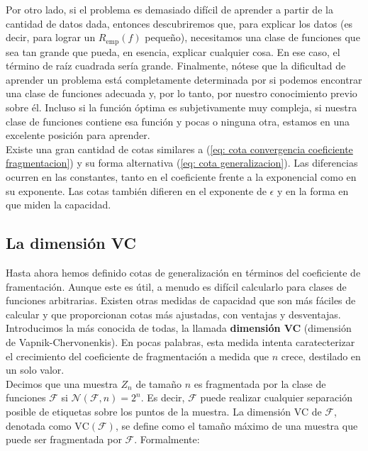 \documentclass{article}
\begin{document}
Por otro lado, si el problema es demasiado difícil de aprender a partir de la cantidad de datos dada, entonces 
descubriremos que, para explicar los datos (es decir, para lograr un \(R_{\text{emp}}(f)\) pequeño), necesitamos 
una clase de funciones que sea tan grande que pueda, en esencia, explicar cualquier cosa. En ese caso, el término 
de raíz cuadrada sería grande. Finalmente, nótese que la dificultad de aprender un problema está completamente 
determinada por si podemos encontrar una clase de funciones adecuada y, por lo tanto, por nuestro conocimiento 
previo sobre él. Incluso si la función óptima es subjetivamente muy compleja, si nuestra clase de funciones 
contiene esa función y pocas o ninguna otra, estamos en una excelente posición para aprender.\\

Existe una gran cantidad de cotas similares a (\ref{eq: cota convergencia coeficiente fragmentacion}) 
y su forma alternativa (\ref{eq: cota generalizacion}). Las diferencias ocurren en 
las constantes, tanto en el coeficiente frente a la exponencial como en su exponente. Las cotas también 
difieren en el exponente de \(\epsilon\) y en la forma en que miden la capacidad. \\

\subsection{La dimensión VC}

Hasta ahora hemos definido cotas de generalización en términos del coeficiente de framentación.
Aunque este es útil, a menudo es difícil calcularlo para clases de funciones arbitrarias. Existen otras medidas de capacidad
que son más fáciles de calcular y que proporcionan cotas más ajustadas, con ventajas y desventajas.
Introducimos la más conocida de todas, la llamada \textbf{dimensión VC} (dimensión de Vapnik-Chervonenkis). En pocas palabras,
esta medida intenta caratecterizar el crecimiento del coeficiente de fragmentación a medida que $n$ crece, destilado en un 
solo valor.\\

Decimos que una muestra \(Z_n\) de tamaño \(n\) es fragmentada por la clase de funciones 
\(\mathcal{F}\) si \(\mathcal{N}(\mathcal{F}, n) = 2^n\). Es decir, \(\mathcal{F}\) puede realizar cualquier separación posible de etiquetas sobre 
los puntos de la muestra. La dimensión VC de \(\mathcal{F}\), denotada como \(\text{VC}(\mathcal{F})\), se define como el tamaño 
máximo de una muestra que puede ser fragmentada por \(\mathcal{F}\). Formalmente:\\
\end{document}
